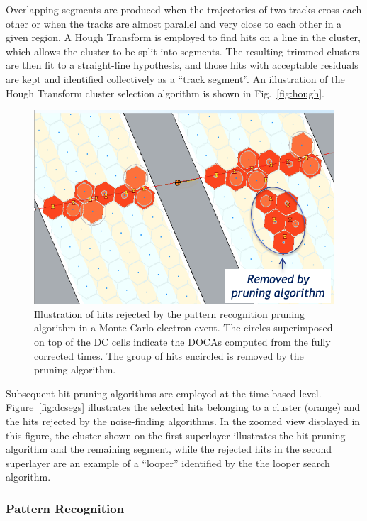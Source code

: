 Overlapping segments are produced when the trajectories of two tracks cross each other or when the tracks are
almost parallel and very close to each other in a given region. A Hough Transform is employed to find hits on a line
in the cluster, which allows the cluster to be split into segments.  The resulting trimmed clusters are then fit to a
straight-line hypothesis, and those hits with acceptable residuals are kept and identified collectively as a
``track segment''. An illustration of the Hough Transform cluster selection algorithm is shown in Fig.~\ref{fig:hough}.

\begin{figure}[t]
\centering
\includegraphics[width=0.9\columnwidth]{pics/dcPattern2.png}
\caption{Illustration of hits rejected by the pattern recognition pruning algorithm in a Monte Carlo electron
  event. The circles superimposed on top of the DC cells indicate the DOCAs computed from the fully corrected
  times. The group of hits encircled is removed by the pruning algorithm.}
\label{fig:strings}
\end{figure}

Subsequent hit pruning algorithms are employed at the time-based level. Figure~\ref{fig:dcsegs} illustrates the
selected hits belonging to a cluster (orange) and the hits rejected by the noise-finding algorithms. In the zoomed
view displayed in this figure, the cluster shown on the first superlayer illustrates the hit pruning algorithm and
the remaining segment, while the rejected hits in the second superlayer are an example of a ``looper'' identified 
by the the looper search algorithm.
  
\subsubsection{Pattern Recognition}

